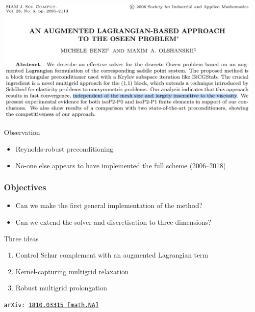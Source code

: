 \documentclass[presentation,aspectratio=43, 10pt]{beamer}
\newcommand{\cmark}{\ding{51}}
\newcommand{\xmark}{\ding{55}}
\newcommand{\arxivlink}[2]{{\texttt{arXiv:\,\href{https://arxiv.org/abs/#1}{#1\,[#2]}}}}
\begin{document}
\begin{frame}
  \begin{center}
    \includegraphics[height=0.66\textheight]{benzi06}
  \end{center}
  \pause
    \begin{block}{Observation}
    \begin{itemize}
    \item[\cmark] Reynolds-robust preconditioning
    \item[\xmark] No-one else appears to have implemented the full scheme
      (2006--2018)
    \end{itemize}
  \end{block}
\end{frame}

\begin{frame}[t]
  \frametitle{Objectives}
  \begin{itemize}
  \item Can we make the first general implementation of the method? \cmark
  \item Can we extend the solver and discretisation to three
    dimensions? \cmark
  \end{itemize}
  \pause
  \begin{block}{Three ideas}
    \begin{enumerate}
    \item Control Schur complement with an augmented Lagrangian term
    \item Kernel-capturing multigrid relaxation
    \item Robust multigrid prolongation
    \end{enumerate}
  \end{block}
  {\hfill\raggedleft\scriptsize \textcite{Farrell:2018} \arxivlink{1810.03315}{math.NA}}
\end{frame}
\end{document}
